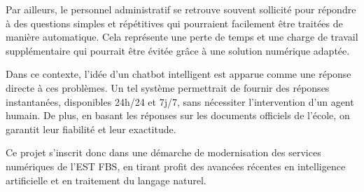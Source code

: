 \documentclass[12pt, a4paper, twoside]{report}
\begin{document}
Par ailleurs, le personnel administratif se retrouve souvent sollicité pour répondre à des questions simples et répétitives qui pourraient facilement être traitées de manière \newline automatique. Cela représente une perte de temps et une charge de travail supplémentaire qui pourrait être évitée grâce à une solution numérique adaptée.
\newline

Dans ce contexte, l'idée d'un chatbot intelligent est apparue comme une réponse \newline directe à ces problèmes. Un tel système permettrait de fournir des réponses instantanées, disponibles 24h/24 et 7j/7, sans nécessiter l'intervention d'un agent humain. De plus, en basant les réponses sur les documents officiels de l'école, on garantit leur fiabilité et leur exactitude.
\newline

Ce projet s'inscrit donc dans une démarche de modernisation des services numériques de l'EST FBS, en tirant profit des avancées récentes en intelligence artificielle et en \newline traitement du langage naturel. 

\newpage
\end{document}
